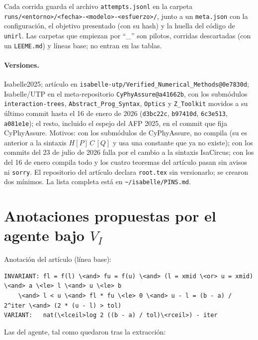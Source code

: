 \documentclass[11pt,a4paper]{article}
\theoremstyle{definition}
\theoremstyle{remark}
\newcommand{\VI}{\texorpdfstring{$V_I$}{V\_I}}
\newcommand{\id}[1]{\texttt{\detokenize{#1}}}
\begin{document}
Cada corrida guarda el archivo \texttt{attempts.jsonl} en la carpeta \nolinkurl{runs/<entorno>/<fecha>-<modelo>-<esfuerzo>/}, junto a un \texttt{meta.json} con la configuración, el objetivo presentado (con su hash) y la huella del código de \texttt{unirl}. Las carpetas que empiezan por ``\_'' son pilotos, corridas descartadas (con un \texttt{LEEME.md}) y líneas base; no entran en las tablas.

\paragraph{Versiones.} Isabelle2025; artículo en \texttt{isabelle-utp/Verified\_Numerical\_Methods@0e7830d}; Isabelle/UTP en el meta-repositorio \texttt{CyPhyAssure@a41662b}, con los submódulos \texttt{interaction-\allowbreak trees}, \texttt{Abstract\_\allowbreak Prog\_\allowbreak Syntax}, \texttt{Optics} y \texttt{Z\_\allowbreak Toolkit} movidos a su último commit hasta el 16 de enero de 2026 (\texttt{d3bc22c}, \texttt{b97410d}, \texttt{6c3e513}, \texttt{a081e1e}); el resto, incluido el espejo del AFP 2025, en el commit que fija CyPhyAssure. Motivos: con los submódulos de CyPhyAssure, \id{ITree_VCG} no compila (su \id{interaction-trees} es anterior a la sintaxis $H[P]\,C\,[Q]$ y usa una constante que ya no existe); con los commits del 23 de julio de 2026 falla \id{ITree_CSP} por el cambio a la sintaxis IsaCircus; con los del 16 de enero compila todo y los cuatro teoremas del artículo pasan sin avisos ni \texttt{sorry}. El repositorio del artículo declara \texttt{root.tex} sin versionarlo; se crearon dos mínimos. La lista completa está en \texttt{\textasciitilde/isabelle/PINS.md}.

\section{Anotaciones propuestas por el agente bajo \VI}\label{app:propuestas}

Anotación del artículo (línea base):
\begin{lstlisting}
INVARIANT: fl = f(l) \<and> fu = f(u) \<and> (l = xmid \<or> u = xmid) \<and> a \<le> l \<and> u \<le> b
    \<and> l < u \<and> fl * fu \<le> 0 \<and> u - l = (b - a) / 2^iter \<and> (2 * (u - l) > tol)
VARIANT:   nat(\<lceil>log 2 ((b - a) / tol)\<rceil>) - iter
\end{lstlisting}

Las del agente, tal como quedaron tras la extracción:


\end{document}
